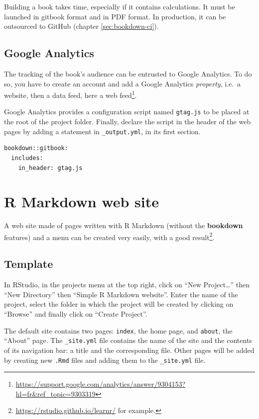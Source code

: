 \documentclass[
  12pt,
  american,
  a4paper,
  extrafontsizes,onecolumn,openright
  ]{memoir}
\begin{document}
Building a book takes time, especially if it contains calculations.
It must be launched in gitbook format and in PDF format.
In production, it can be outsourced to GitHub (chapter \ref{sec:bookdown-ci}).

\hypertarget{google-analytics}{%
\subsection{Google Analytics}\label{google-analytics}}

The tracking of the book's audience can be entrusted to Google Analytics.
To do so, you have to create an account and add a Google Analytics \emph{property}, i.e.~a website, then a data feed, here a web feed\footnote{\url{https://support.google.com/analytics/answer/9304153?hl=fr\&ref_topic=9303319}}.

Google Analytics provides a configuration script named \texttt{gtag.js} to be placed at the root of the project folder.
Finally, declare the script in the header of the web pages by adding a statement in \texttt{\_output.yml}, in its first section.

\begin{verbatim}
bookdown::gitbook:
  includes:
    in_header: gtag.js
\end{verbatim}

\hypertarget{r-markdown-web-site}{%
\section{R Markdown web site}\label{r-markdown-web-site}}

A web site made of pages written with R Markdown (without the \textbf{bookdown} features) and a menu can be created very easily, with a good result\footnote{\url{https://rstudio.github.io/learnr/} for example.}.

\hypertarget{template}{%
\subsection{Template}\label{template}}

In RStudio, in the projects menu at the top right, click on \enquote{New Project\ldots{}} then \enquote{New Directory} then \enquote{Simple R Markdown website}.
Enter the name of the project, select the folder in which the project will be created by clicking on \enquote{Browse} and finally click on \enquote{Create Project}.

The default site contains two pages: \texttt{index}, the home page, and \texttt{about}, the \enquote{About} page.
The \texttt{\_site.yml} file contains the name of the site and the contents of its navigation bar: a title and the corresponding file.
Other pages will be added by creating new \texttt{.Rmd} files and adding them to the \texttt{\_site.yml} file.
\end{document}
